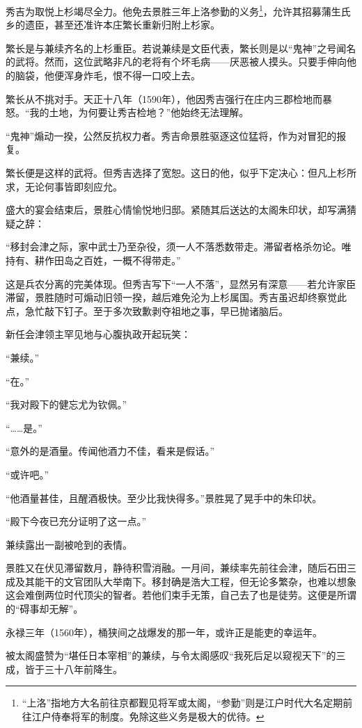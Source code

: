 \documentclass[
]{book}
\begin{document}
秀吉为取悦上杉竭尽全力。他免去景胜三年上洛参勤的义务\footnote{``上洛''指地方大名前往京都觐见将军或太阁，``参勤''则是江户时代大名定期前往江户侍奉将军的制度。免除这些义务是极大的优待。}，允许其招募蒲生氏乡的遗臣，甚至还准许本庄繁长重新归附上杉家。

繁长是与兼续齐名的上杉重臣。若说兼续是文臣代表，繁长则是以``鬼神''之号闻名的武将。然而，这位武略非凡的老将有个坏毛病------厌恶被人摸头。只要手伸向他的脑袋，他便浑身炸毛，恨不得一口咬上去。

繁长从不挑对手。天正十八年（1590年），他因秀吉强行在庄内三郡检地而暴怒。``我的土地，为何要让秀吉检地？''他始终无法理解。

``鬼神''煽动一揆，公然反抗权力者。秀吉命景胜驱逐这位猛将，作为对冒犯的报复。

繁长便是这样的武将。但秀吉选择了宽恕。这日的他，似乎下定决心：但凡上杉所求，无论何事皆即刻应允。

盛大的宴会结束后，景胜心情愉悦地归邸。紧随其后送达的太阁朱印状，却写满猜疑之辞：

``移封会津之际，家中武士乃至杂役，须一人不落悉数带走。滞留者格杀勿论。唯持有、耕作田岛之百姓，一概不得带走。''

这是兵农分离的完美体现。但秀吉写下``一人不落''，显然另有深意------若允许家臣滞留，景胜随时可煽动旧领一揆，越后难免沦为上杉属国。秀吉虽迟却终察觉此点，急忙敲下钉子。至于多次致歉剥夺祖地之事，早已抛诸脑后。

新任会津领主罕见地与心腹执政开起玩笑：

``兼续。''

``在。''

``我对殿下的健忘尤为钦佩。''

``\ldots\ldots 是。''

``意外的是酒量。传闻他酒力不佳，看来是假话。''

``或许吧。''

``他酒量甚佳，且醒酒极快。至少比我快得多。''景胜晃了晃手中的朱印状。

``殿下今夜已充分证明了这一点。''

兼续露出一副被呛到的表情。

景胜又在伏见滞留数月，静待积雪消融。一月间，兼续率先前往会津，随后石田三成及其能干的文官团队大举南下。移封确是浩大工程，但无论多繁杂，也难以想象这会难倒两位时代顶尖的智者。若他们束手无策，自己去了也是徒劳。这便是所谓的``碍事却无解''。

永禄三年（1560年），桶狭间之战爆发的那一年，或许正是能吏的幸运年。

被太阁盛赞为``堪任日本宰相''的兼续，与令太阁感叹``我死后足以窥视天下''的三成，皆于三十八年前降生。
\end{document}
